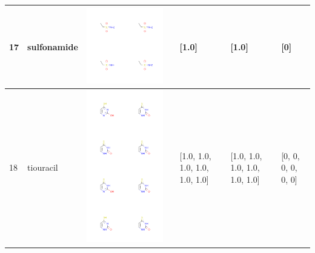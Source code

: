 \begin{longtable}{|l|l|l|l|l|l|l|}
\hline
17 & sulfonamide & \includegraphics[scale=0.6]{sulfonamideMV.png} & & [1.0]& [1.0] & [0] \\
\hline
18 & tiouracil & \includegraphics[scale=0.6]{tiouracilMV.png} & & [1.0, 1.0, 1.0, 1.0, 1.0, 1.0]& [1.0, 1.0, 1.0, 1.0, 1.0, 1.0] & [0, 0, 0, 0, 0, 0] \\

\end{longtable}
